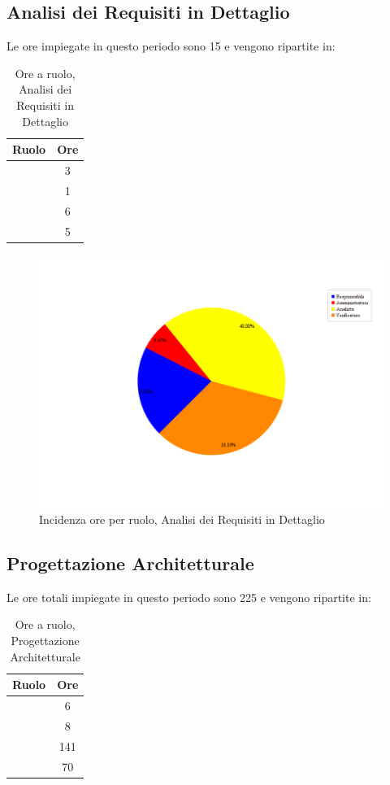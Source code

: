 \subsection{Analisi dei Requisiti in Dettaglio}
Le ore impiegate in questo periodo sono 15 e vengono ripartite in:

\begin{table}[H]
	\begin{center}
		\begin{tabular}{|c|c|}
			\hline
			\textbf{Ruolo}	& \textbf{Ore} \\
			\hline
			\Res	&	3	\\
			\hline
			\Amm	&	1	\\
			\hline
			\Ana	&	6	\\
			\hline
			\Ver	&	5	\\
			\hline
		\end{tabular}
	\end{center}
	\caption{Ore a ruolo, Analisi dei Requisiti in Dettaglio}
\end{table}

\begin{figure}[H]
	\centering
	\includegraphics[scale=0.5]{immagini/Grafi/OreRuoloRRD}
	\caption{Incidenza ore per ruolo, Analisi dei Requisiti in Dettaglio}
\end{figure}

\subsection{Progettazione Architetturale}
Le ore totali impiegate in questo periodo sono 225 e vengono ripartite in:
\begin{table}[H]
	\begin{center}
		\begin{tabular}{|c|c|}
			\hline
			\textbf{Ruolo}	& \textbf{Ore} \\
			\hline
			\Res	&	6	\\
			\hline
			\Amm	&	8	\\
			\hline
			\Prog		&	141	\\
			\hline
			\Ver	&	70	\\
			\hline
		\end{tabular}
	\end{center}
	\caption{Ore a ruolo, Progettazione Architetturale}
\end{table}

